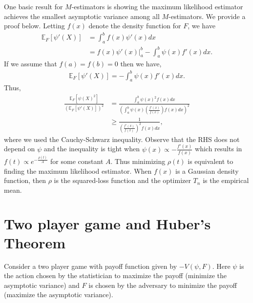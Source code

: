 \documentclass{article}
\newcommand{\Ep}{\ensuremath{\mathbb{E}_F}}
\begin{document}
One basic result for $M$-estimators is showing the maximum likelihood estimator achieves the smallest asymptotic variance among all $M$-estimators. We provide a proof below. Letting $f(x)$ denote the density function for $F$, we have
\begin{align*}
    \Ep[\psi'(X)] &= \int_{a}^b f(x) \psi'(x) dx \\
    &= f(x) \psi'(x) \Biggr|_a^b -  \int_{a}^b  \psi(x) f'(x) dx.
\end{align*}
If we assume that $f(a) = f(b) =  0 $ then we have, 
\begin{align*}
    \Ep[\psi'(X)] = -  \int_{a}^b  \psi(x) f'(x) dx.
\end{align*}
Thus,
\begin{align*}
    \frac{\Ep[\psi(X)^2]}{(\Ep[\psi'(X)])^2} &= \frac{\int_a^b \psi(x)^2 f(x) dx}{\left(\int_a^b \psi(x) \left( \frac{f'(x)}{f(x)}\right) f(x) dx\right)^2}\\
    &\geq \frac{1}{\left( \frac{f'(x)}{f(x)}\right)^2 f(x) dx},
\end{align*}
where we used the Cauchy-Schwarz inequality. Observe that the RHS does not depend on $\psi$ and the inequality is tight when $\psi(x) \propto -\frac{f'(x)}{f(x)}$ which results in $f(t) \propto e^{-\frac{\rho(t)}{A}}$ for some constant $A$. Thus minimizing $\rho(t)$ is equivalent to finding the maximum likelihood estimator. When $f(x)$ is a Gaussian density function, then $\rho$ is the squared-loss function and the optimizer $T_n$ is the empirical mean. 


\section{Two player game and Huber's Theorem}
Consider a two player game with payoff function given by $-V(\psi, F)$. Here $\psi$ is the action chosen by the statistician to maximize the payoff (minimize the asymptotic variance) and $F$ is chosen by the adversary to minimize the payoff (maximize the asymptotic variance). 
\end{document}

